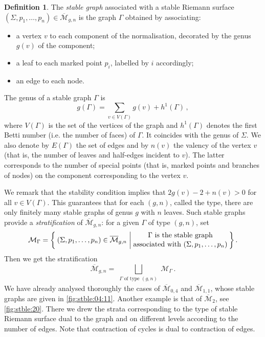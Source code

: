 \documentclass[11pt,reqno]{amsart}
\numberwithin{equation}{section}
\newcommand{\mc}[1]{\mathcal{#1}}
\newcommand{\M}{\mc{M}}
\newcommand{\Mbar}{\overline{\M}}
\theoremstyle{plain}
\theoremstyle{definition}
\newtheorem{definition}[theorem]{Definition}
\begin{document}
\begin{definition}
  The \emph{stable graph} associated with a stable Riemann surface $(\Sigma,p_1,\dots,p_n) \in \Mbar_{g,n}$ is the graph $\Gamma$ obtained by associating:
  \begin{itemize}
    \item a vertex $v$ to each component of the normalisation, decorated by the genus $g(v)$ of the component;
    \item a leaf to each marked point $p_i$, labelled by $i$ accordingly;
    \item an edge to each node.
  \end{itemize}
  The genus of a stable graph $\Gamma$ is
  \begin{equation}
    g(\Gamma) = \sum_{v\in V(\Gamma)} g(v) + h^1(\Gamma) \,,
  \end{equation}
  where $V(\Gamma)$ is the set of the vertices of the graph and $h^1(\Gamma)$ denotes the first Betti number (i.e. the number of faces) of $\Gamma$. It coincides with the genus of $\Sigma$. We also denote by $E(\Gamma)$ the set of edges and by $n(v)$ the valency of the vertex $v$ (that is, the number of leaves and half-edges incident to $v$). The latter corresponds to the number of special points (that is, marked points and branches of nodes) on the component corresponding to the vertex $v$.
\end{definition}

We remark that the stability condition implies that $2g(v) - 2 + n(v) > 0$ for all $v \in V(\Gamma)$. This guarantees that for each $(g,n)$, called the type, there are only finitely many stable graphs of genus $g$ with $n$ leaves. Such stable graphs provide a \emph{stratification} of $\Mbar_{g,n}$: for a given $\Gamma$ of type $(g,n)$, set
\begin{equation}
  \M_{\Gamma}
  =
  \Set{
    (\Sigma,p_1,\dots,p_n) \in \Mbar_{g,n}
    |
    \substack{
      \displaystyle \Gamma \text{ is the stable graph} \\[.5ex]
      \displaystyle \text{associated with }(\Sigma,p_1,\dots,p_n) 
    }
  } .
\end{equation}
Then we get the stratification
\begin{equation}
  \Mbar_{g,n}
  =
  \bigsqcup_{\substack{\Gamma \text{ of type }(g,n)}} \M_{\Gamma} \,.
\end{equation}
We have already analysed thoroughly the cases of $\Mbar_{0,4}$ and $\Mbar_{1,1}$, whose stable graphs are given in \cref{fig:stble:04:11}. Another example is that of $\Mbar_{2}$, see \cref{fig:stble:20}. There we drew the strata corresponding to the type of stable Riemann surface dual to the graph and on different levels according to the number of edges. Note that contraction of cycles is dual to contraction of edges.
\end{document}
